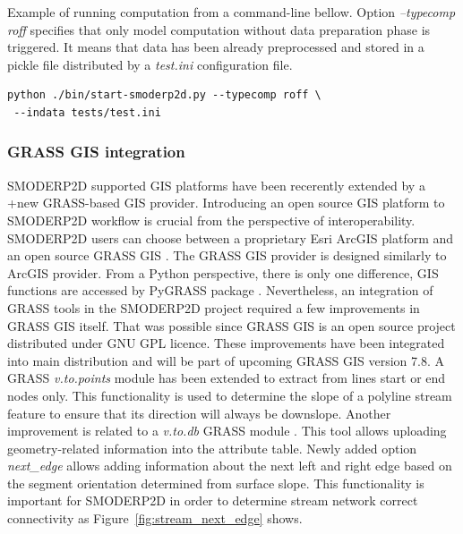 Example of running computation from a command-line bellow. Option {\it
  --typecomp roff} specifies that only model computation without data
preparation phase is triggered. It means that data has been already
preprocessed and stored in a pickle file distributed by a {\it test.ini}
configuration file.

\begin{verbatim}
python ./bin/start-smoderp2d.py --typecomp roff \
 --indata tests/test.ini
\end{verbatim}

\subsubsection{GRASS GIS integration}\label{sec:grass_provider}
SMODERP2D supported GIS platforms have been recerently extended by a
+new GRASS-based GIS provider. Introducing an open source GIS platform
to SMODERP2D workflow is crucial from the perspective of
interoperability. SMODERP2D users can choose between a proprietary
Esri ArcGIS platform and an open source GRASS GIS
\cite{neteler2012grass}. The GRASS GIS provider is designed similarly
to ArcGIS provider. From a Python perspective, there is only one
difference, GIS functions are accessed by PyGRASS package
\cite{ijgi2010201}. Nevertheless, an integration of GRASS tools in the
SMODERP2D project required a few improvements in GRASS GIS
itself. That was possible since GRASS GIS is an open source project
distributed under GNU GPL licence. These improvements have been
integrated into main distribution and will be part of upcoming GRASS
GIS version 7.8. A GRASS {\em v.to.points} module
\cite{v-to-points-2019} has been extended to extract from lines start
or end nodes only. This functionality is used to determine the slope
of a polyline stream feature to ensure that its direction will always
be downslope. Another
improvement is related to a {\em v.to.db} GRASS module
\cite{v-to-db-2019}. This tool allows uploading geometry-related
information into the attribute table. 
Newly added option {\it
next\_edge} allows adding information about the next left and right
edge based on the segment orientation determined from surface slope. 
This functionality is important for SMODERP2D in order to
determine stream network correct connectivity as
Figure~\ref{fig:stream_next_edge} shows.

